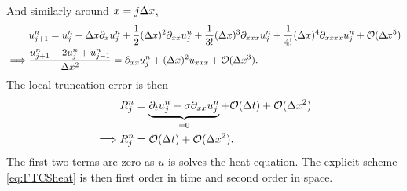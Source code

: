And similarly around $x=j\Delta x$,
\begin{align*}
&u^n_{j+1}=  u^n_j + \Delta x \partial_x u^n_j + \frac{1}{2}(\Delta x)^2 \partial_{xx} u^n_j + \frac{1}{3!}(\Delta x)^3 \partial_{xxx} u^n_j + \frac{1}{4!}(\Delta x)^4 \partial_{xxxx} u^n_j +  \mathcal{O}(\Delta x^5)\\
\implies& \frac{u^n_{j+1} -2  u^n_j + u^n_{j-1}}{\Delta x^2}  = \partial_{xx}u^n_j + (\Delta x)^2u_{xxx} + \mathcal{O}(\Delta x^3).
\end{align*}  
The local truncation error is then
\begin{align*}
&R^n_j = \underbrace{\partial_t u^n_j - \sigma \partial_{xx}u^n_j}_{=0} +\mathcal{O}(\Delta t)+ \mathcal{O}(\Delta x^2)\\
\implies& R^n_j = \mathcal{O}(\Delta t)+\mathcal{O}(\Delta x^2).
\end{align*}
The first two terms are zero as $u$ is solves the heat equation. The explicit scheme \eqref{eq:FTCSheat} is then first order in time and second order in space. 

